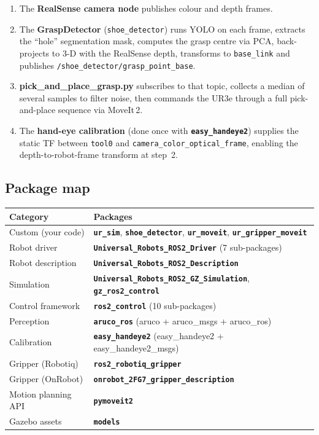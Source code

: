 \documentclass[11pt,a4paper]{article}
\newcommand{\pkg}[1]{\texttt{\textbf{#1}}}
\newcommand{\file}[1]{\texttt{#1}}
\newcommand{\topic}[1]{\texttt{\small #1}}
\begin{document}
\begin{enumerate}
  \item The \textbf{RealSense camera node} publishes colour and depth frames.
  \item The \textbf{GraspDetector} (\file{shoe\_detector}) runs YOLO on each
        frame, extracts the ``hole'' segmentation mask, computes the grasp
        centre via PCA, back-projects to 3-D with the RealSense depth,
        transforms to \texttt{base\_link} and publishes
        \topic{/shoe\_detector/grasp\_point\_base}.
  \item \textbf{pick\_and\_place\_grasp.py} subscribes to that topic,
        collects a median of several samples to filter noise, then commands
        the UR3e through a full pick-and-place sequence via MoveIt\,2.
  \item The \textbf{hand-eye calibration} (done once with \pkg{easy\_handeye2})
        supplies the static TF between \texttt{tool0} and
        \texttt{camera\_color\_optical\_frame}, enabling the
        depth-to-robot-frame transform at step~2.
\end{enumerate}

\subsection*{Package map}

\begin{center}
\begin{tabular}{|l|l|}
\hline
\textbf{Category} & \textbf{Packages} \\
\hline
Custom (your code) &
  \pkg{ur\_sim}, \pkg{shoe\_detector}, \pkg{ur\_moveit}, \pkg{ur\_gripper\_moveit} \\
Robot driver &
  \pkg{Universal\_Robots\_ROS2\_Driver} (7 sub-packages) \\
Robot description &
  \pkg{Universal\_Robots\_ROS2\_Description} \\
Simulation &
  \pkg{Universal\_Robots\_ROS2\_GZ\_Simulation}, \pkg{gz\_ros2\_control} \\
Control framework &
  \pkg{ros2\_control} (10 sub-packages) \\
Perception &
  \pkg{aruco\_ros} (aruco + aruco\_msgs + aruco\_ros) \\
Calibration &
  \pkg{easy\_handeye2} (easy\_handeye2 + easy\_handeye2\_msgs) \\
Gripper (Robotiq) &
  \pkg{ros2\_robotiq\_gripper} \\
Gripper (OnRobot) &
  \pkg{onrobot\_2FG7\_gripper\_description} \\
Motion planning API &
  \pkg{pymoveit2} \\
Gazebo assets &
  \pkg{models} \\
\hline
\end{tabular}
\end{center}
\end{document}
